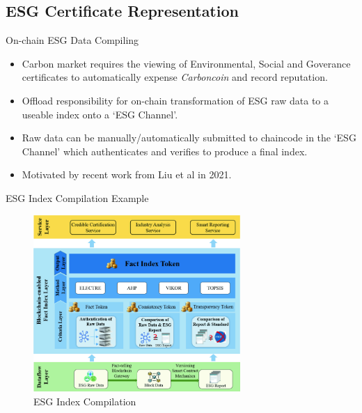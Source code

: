 \subsection{ESG Certificate Representation}
\begin{frame}{On-chain ESG Data Compiling}
    \begin{itemize}
        \item Carbon market requires the viewing of Environmental, Social
              and Goverance certificates to automatically expense
              \textit{Carboncoin} and record reputation.
        \item Offload responsibility for on-chain transformation of ESG raw
              data to a useable index onto a `ESG Channel'.
        \item Raw data can be manually/automatically submitted to chaincode
              in the `ESG Channel' which authenticates and verifies to
              produce a final index.
        \item Motivated by recent work from Liu et al in 2021.
    \end{itemize}
\end{frame}
\begin{frame}{ESG Index Compilation Example}
    \begin{figure}
        \caption{ESG Index Compilation}
        \centering
        \includegraphics[height=0.6\textheight, width=0.7\textwidth]
        {figures/esg-rep.png}
    \end{figure}
\end{frame}
